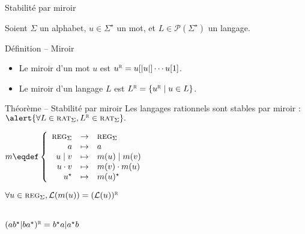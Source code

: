 
\begingroup

\begin{frame}{Stabilité par miroir}

  \vspace{-1mm}
  Soient $\Sigma$ un alphabet, $u \in \Sigma^\star$ un mot, et $L \in \mathscr{P}(\Sigma^\star)$ un langage.

  \begin{block}{Définition -- Miroir}
    \begin{itemize}
    \item \vspace{-1mm}Le miroir d'un mot $u$ est $u^{\textsc{r}} = u[|u|]\cdots u[1]$.
    \item \vspace{-1mm}Le miroir d'un langage $L$ est $L^{\textsc{r}} = \{u^{\textsc{r}} \mid u \in L\}$.
    \end{itemize}
  \end{block}
  
  \vspace{-2mm}
  \begin{alertblock}{Théorème -- Stabilité par miroir}
    Les langages rationnels sont stables par miroir : $\alert{\forall L \in \textsc{rat}_\Sigma, L^{\textsc{r}} \in \textsc{rat}_\Sigma}.$
  \end{alertblock}

  \begin{minipage}[t]{.5\textwidth}

    \vspace{3mm}
    $m \eqdef \left\{\begin{array}{rcl}
      \textsc{reg}_\Sigma & \rightarrow & \textsc{reg}_\Sigma\\
      a & \mapsto & a\\
      u \mid v & \mapsto & m(u) \mid m(v)\\
      u \cdot v & \mapsto & m(v) \cdot m(u)\\
      u^\star & \mapsto & m(u)^\star\\
      \end{array}\right.$

    $\forall u \in \textsc{reg}_\Sigma, \mathcal{L}(m(u)) = (\mathcal{L}(u))^{\textsc{r}}$
    
    \vspace{3mm}\\ $(ab^\star | ba^\star)^{\textsc{r}} = b^\star a | a^\star b$
      

\end{minipage}
\end{frame}
